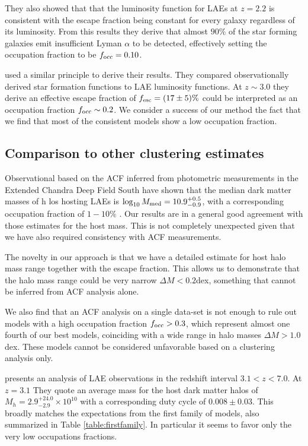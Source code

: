 \documentclass[usenatbib]{mn2e}
\newcommand{\hMsun}{{\ifmmode{h^{-1}{\rm
        {M_{\odot}}}}\else{$h^{-1}{\rm{M_{\odot}}}$}\fi}}
\newcommand{\Msun}{{\ifmmode{{\rm {M_{\odot}}}}\else{${\rm{M_{\odot}}}$}\fi}}
\begin{document}
They also showed that that the luminosity function for LAEs at $z=2.2$ is
consistent with the escape fraction being constant for every galaxy
regardless of its luminosity. From this results they derive that
almost $90\%$ of the star forming galaxies emit insufficient
Lyman $\alpha$ to be detected, effectively setting the occupation
fraction to be $f_{\rm occ}=0.10$.  

\cite{Dijkstra2013} used a similar principle to derive their results. They
compared observationally derived star formation functions to LAE
luminosity functions. At $z\sim 3.0$ they derive an effective escape
fraction of $f_{\rm esc}=(17\pm 5)\%$ could be interpreted as an
occupation fraction $f_{\rm occ}\sim 0.2$.  We consider a success of
our method the fact that we find that most of the consistent models
show a low occupation fraction.    



\subsection{Comparison to other clustering estimates}

Observational based on the ACF inferred from photometric measurements
in the Extended Chandra Deep Field South have shown that the median
dark matter masses of h los hosting LAEs is $\log_{10}M_{\rm
  med}=10.9^{+0.5}_{-0.9}$\Msun, with a corresponding occupation
fraction of $1-10\%$  \citep{Gawiser07}.  Our results are in a general
good agreement with those estimates for the host mass. This is not
completely unexpected given that we have also required consistency
with ACF measurements.   

The novelty in our approach is that we have a detailed estimate for 
host halo mass range together with the escape fraction. This allows us
to demonstrate that the halo mass range could be very narrow $\Delta M <
0.2$dex, something that cannot be inferred from ACF analysis alone. 

We also find that an ACF analysis on a single data-set is not enough to rule
out models with a high occupation fraction $f_{\rm occ}>0.3$, which
represent almost one fourth of our best models, coinciding with a wide
range in halo masses $\Delta M>1.0$ dex. These models cannot be
considered unfavorable based on a clustering analysis only.

\cite{Ouchi2010} presents an analysis of LAE observations in the
redshift interval $3.1<z<7.0$. At $z=3.1$ They quote an average
mass for the host dark matter halos of $M_{h}=2.9^{+24.0}_{-2.9}\times
10^{10}$ \hMsun with a corresponding duty cycle of $0.008\pm
0.03$.  This broadly matches the expectations from the first family of
models, also summarized in Table \ref{table:firstfamily}. In
particular it seems to favor only the very low occupations
fractions. 
\end{document}
